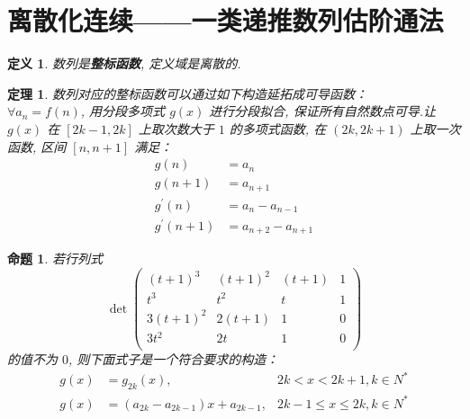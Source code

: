 \documentclass[10pt,a4paper]{book}
\theoremstyle{thmstyle} %
\newtheorem{theorem}{定理}[chapter]
\theoremstyle{defstyle} %
\newtheorem{definition}{定义}[chapter]
\theoremstyle{prostyle} %
\newtheorem{proposition}{命题}[chapter]
\begin{document}
	\section{离散化连续——一类递推数列估阶通法\textsuperscript{\cite{QLN2021}}}
	
	\begin{definition}
		数列是\textbf{整标函数}, 定义域是离散的.
	\end{definition}
	
	\begin{theorem}
		数列对应的整标函数可以通过如下构造延拓成可导函数：\\
		$\forall a_n=f(n)$, 用分段多项式 $g(x)$ 进行分段拟合, 保证所有自然数点可导.让 $g(x)$ 在 $[2k-1, 2k]$ 上取次数大于 $1$ 的多项式函数, 在 $(2k,2k+1)$ 上取一次函数, 区间 $[n, n+1]$ 满足：
		\begin{align*}
			g(n)&=a_n \\
			g(n+1)&=a_{n+1} \\
			g^\prime(n)&=a_n-a_{n-1} \\
			g^\prime(n+1)&=a_{n+2}-a_{n+1}
		\end{align*}
	\end{theorem}
	
	\begin{proposition}
		若行列式
		$$
		\det \left. \left( \begin{matrix}
			\left( t+1 \right) ^3&		\left( t+1 \right) ^2&		\left( t+1 \right)&		1\\
			t^3&		t^2&		t&		1\\
			3\left( t+1 \right) ^2&		2\left( t+1 \right)&		1&		0\\
			3t^2&		2t&		1&		0\\
		\end{matrix} \right. \right) 
		$$
		的值不为 $0$, 则下面式子是一个符合要求的构造：
		\begin{align*}
			g\left( x \right) &=g_{2k}\left( x \right) , &2k<x<2k+1, k\in N^* \\
			g\left( x \right) &=\left( a_{2k}-a_{2k-1} \right) x+a_{2k-1}, &2k-1\leqslant x\leqslant 2k, k\in N^*
		\end{align*}
		
	\end{proposition}    
	
\end{document}
